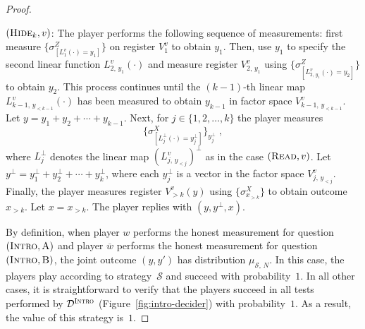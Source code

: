 \documentclass[11pt]{article}
\theoremstyle{definition}
\newcommand{\sampler}{\mathcal{S}}
\newcommand{\decider}{\mathcal{D}}
\newcommand{\strategy}{\mathscr{S}}
\newcommand{\gamestyle}[1]{\ensuremath{\textsc{#1}}\xspace}
\newcommand{\intro}{\gamestyle{Intro}}
\newcommand{\labelstyle}[1]{\ensuremath{\textsc{#1}}\xspace}
\newcommand{\trole}{\ensuremath{v}} %
\newcommand{\alice}{\labelstyle{A}}
\newcommand{\bob}{\labelstyle{B}}
\newcommand{\typestyle}[1]{\ensuremath{\textsc{#1}}\xspace}
\newcommand{\Read}{\typestyle{Read}}
\newcommand{\Hide}[1]{\typestyle{Hide}_{#1}}
\newcommand{\Introspect}{\typestyle{Intro}}
\newcommand{\tnote}[1]{}
\newcommand{\hnote}[1]{}
\begin{document}
\begin{proof}
\begin{description}
  \item $(\Hide{k}, \trole)$:
    The player performs the following sequence of measurements: first measure
    $\{ \sigma^Z_{[L^\trole_{1}(\cdot) = y_{1}]} \}$ on register $V_1^v$ to
    obtain $y_1$.
    Then, use $y_1$ to specify the second linear function
    $L^\trole_{2,\, y_1}(\cdot)$ and measure register $V^\trole_{2,\,y_1}$ using
    $\{ \sigma^Z_{[L^\trole_{2,\, y_1}(\cdot) = y_{2}]} \}$ to obtain $y_2$.
    This process continues until the $(k-1)$-th linear map $L_{k-1,\, y_{<
        k-1}}^\trole(\cdot)$ has been measured to obtain $y_{k-1}$ in factor
    space $V_{k-1,\, y_{< k-1}}^\trole$.
    Let $y = y_1 + y_2 + \cdots + y_{k-1}$.
    Next, for $j \in \{1, 2, \ldots, k\}$ the player measures
    \begin{equation*}
      \Big \{ \sigma^X_{[L_{j}^\perp(\cdot) = y^\perp_{j}]} \Big \}_{y^\perp_j}\;,
    \end{equation*}
    where $L_j^\perp$ denotes the linear map $(L^\trole_{j,\, y_{<j}})^\perp$ as in
    the case $(\Read, \trole)$.
    Let $y^\perp = y_1^\perp + y_2^\perp + \cdots + y_k^\perp$, where each
    $y_j^\perp$ is a vector in the factor space $V^\trole_{j,\, y_{<j}}$.
    Finally, the player measures register $V_{> k}^\trole(y)$ using
    $\{\sigma^X_{x_{>k}}\}$ to obtain outcome $x_{> k}$.
    Let $x = x_{> k}$.
    The player replies with $(y,y^\perp,x)$.
\end{description}

By definition, when player $w$ performs the honest measurement for question
$(\Introspect, \alice)$ and player $\overline{w}$ performs the honest
measurement for question $(\Introspect, \bob)$, the joint outcome $(y, y')$ has
distribution $\mu_{\sampler,\, N}$.
In this case, the players play according to strategy~$\strategy$ and succeed
with probability~$1$.
In all other cases, it is straightforward to verify that the players succeed in all tests performed by $\decider^\intro$ (Figure~\ref{fig:intro-decider}) with probability~$1$.
As a result, the value of this strategy is~$1$. 


\end{proof}
\end{document}
